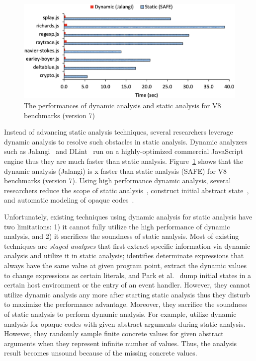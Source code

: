 \begin{figure}
  \centering
  \includegraphics[width=\linewidth]{img/performance_v8v7}
  \vspace*{-2em}
  \caption{The performances of dynamic analysis and static analysis for V8
  benchmarks (version 7)}
  \label{fig:performance}
  \vspace*{-1em}
\end{figure}

Instead of advancing static analysis techniques, several researchers leverage
dynamic analysis to resolve such obstacles in static analysis.  Dynamic
analyzers such as Jalangi~\cite{jalangi} and DLint~\cite{dlint} run on a
highly-optimized commercial JavaScript engine thus they are much faster than
static analysis.  Figure~\ref{fig:performance} shows that the dynamic analysis
(Jalangi) is x faster than static analysis (SAFE) for V8 benchmarks
(version 7).  Using high performance dynamic analysis, several researchers
reduce the scope of static analysis~\cite{determinacy, blendedJS}, construct
initial abstract state~\cite{battles, eha}, and automatic modeling of opaque
codes~\cite{sra}.

Unfortunately, existing techniques using dynamic analysis for static analysis
have two limitations: 1) it cannot fully utilize the high performance of dynamic
analysis, and 2) it sacrifices the soundness of static analysis.  Most of
existing techniques are \textit{staged analyses} that first extract specific
information via dynamic analysis and utilize it in static analysis;
\citet{determinacy} identifies determinate expressions that always have the same
value at given program point, \citet{blendedJS} extract the dynamic values to
change expressions as certain literals, and Park et al.~\cite{battles,eha} dump
initial states in a certain host environment or the entry of an event handler.
However, they cannot utilize dynamic analysis any more after starting static
analysis thus they disturb to maximize the performance advantage.  Moreover,
they sacrifice the soundness of static analysis to perform dynamic analysis.
For example, \citet{sra} utilize dynamic analysis for opaque codes with given
abstract arguments during static analysis.  However, they randomly sample finite
concrete values for given abstract arguments when they represent infinite number
of values.  Thus, the analysis result becomes unsound because of the missing
concrete values.

